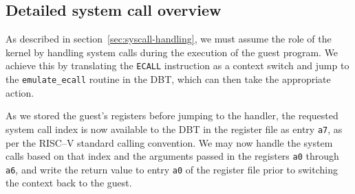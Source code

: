 \subsection{Detailed system call overview}
As described in section~\vref{sec:syscall-handling}, we must assume the role of the kernel by handling system calls during the execution of the guest program.
We achieve this by translating the \texttt{ECALL} instruction as a context switch and jump to the \texttt{emulate\_ecall} routine in the DBT, which can then take the appropriate action.

As we stored the guest's registers before jumping to the handler, the requested system call index is now available to the DBT in the register file as entry \texttt{a7}, as per the RISC--V standard calling convention.
We may now handle the system calls based on that index and the arguments passed in the registers \texttt{a0} through \texttt{a6}, and write the return value to entry \texttt{a0} of the register file prior to switching the context back to the guest.

